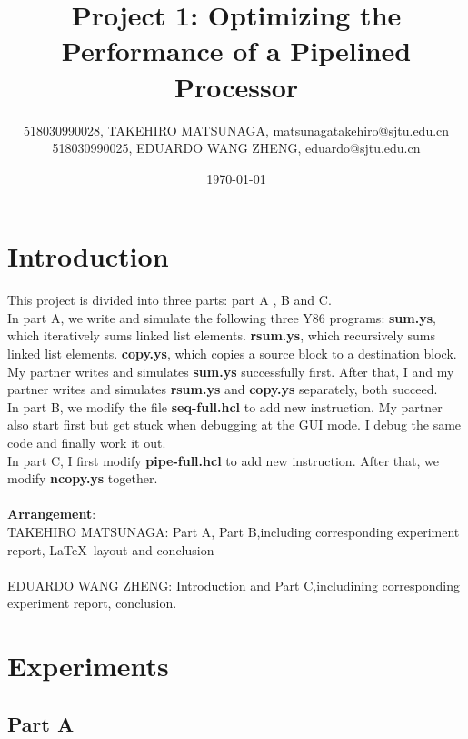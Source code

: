 \documentclass{article}
\title{\textbf{Project 1: Optimizing the Performance of a Pipelined Processor}} %
\author{518030990028, TAKEHIRO MATSUNAGA, matsunagatakehiro@sjtu.edu.cn \\
        518030990025, EDUARDO WANG ZHENG, eduardo@sjtu.edu.cn \\
     } %
\date{\today} %
\begin{document}
\maketitle %

\section{Introduction}

This project is divided into three parts: part A , B and C. \\

In part A, we write and simulate the following three Y86 programs: \textbf{sum.ys}, which iteratively sums linked list elements. \textbf{rsum.ys}, which recursively sums linked list elements. \textbf{copy.ys}, which copies a source block to a destination block. My partner writes and simulates \textbf{sum.ys} successfully first. After that, I and my partner writes and simulates \textbf{rsum.ys} and \textbf{copy.ys} separately, both succeed. \\

In part B, we modify the file \textbf{seq-full.hcl} to add new instruction. My partner also start first but get stuck when debugging at the GUI mode. I debug the same code and finally work it out.\\

In part C, I first modify \textbf{pipe-full.hcl} to add new instruction. After that, we modify \textbf{ncopy.ys} together. \\ \\
\textbf{Arrangement}:\\
TAKEHIRO MATSUNAGA: Part A, Part B,including corresponding experiment report,  \LaTeX \ layout and conclusion\\ \\
EDUARDO WANG ZHENG: Introduction and Part C,includining corresponding experiment report, conclusion.



\section{Experiments}

\subsection{Part A}
\end{document}
